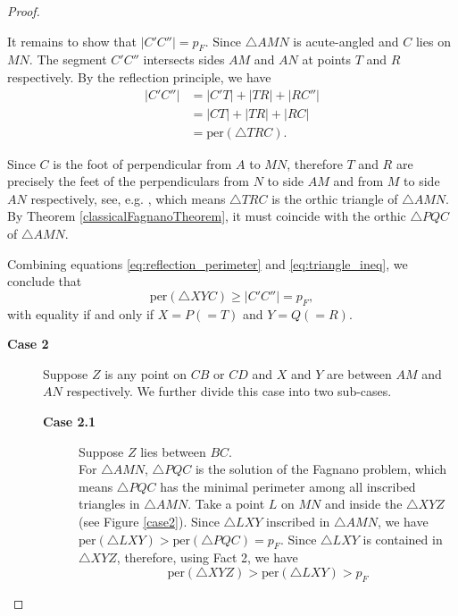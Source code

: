 \documentclass[12pt,a4paper]{article}
\theoremstyle{definition}
\theoremstyle{remark}
\begin{document}
\begin{proof}
\begin{description}
	It remains to show that $|C'C''| = p_F$. Since $\triangle AMN$ is acute-angled and $C$ lies on $MN$. The segment $C'C''$ intersects 	sides $AM$ and $AN$ at points $T$ and $R$ respectively. By the reflection 
	principle, we have
	\begin{align*}
		|C'C''| &= |C'T| + |TR| + |RC''|\\
		&= |CT| + |TR| + |RC|\\
		&= \mathrm{per}(\triangle TRC).
	\end{align*}
	
	
	Since $C$ is the foot of perpendicular from $A$ to $MN$, therefore $T$ and $R$ are precisely the feet of the perpendiculars from $N$ to side $AM$ and from $M$ to side $AN$ respectively, see,  e.g. \cite[Problem 1.1.3]{andreescu_geometric_2006}, which means $\triangle TRC$ is the orthic triangle of $\triangle AMN$. By Theorem  \ref{classicalFagnanoTheorem}, it must coincide with the orthic $\triangle PQC$ of  $\triangle AMN$.
	
	Combining equations \eqref{eq:reflection_perimeter} and 
	\eqref{eq:triangle_ineq}, we conclude that
	$$\mathrm{per}(\triangle XYC) \geq |C'C''| = p_F,$$
	with equality if and only if $X = P (=T)$ and $Y = Q(=R)$.
	
\end{description}



	
	
	
	
	
	
	
	
	
	
	
	
	
	

	
	\begin{description}
		\item[\textbf{Case 2}] Suppose $Z$ is any point on $CB$ or $CD$ and $X$ and $Y$ are between $AM$ and $AN$ respectively.
		We further divide this case into two sub-cases.  
		\begin{description}
			\item[\textbf{Case 2.1}] Suppose $Z$ lies between $BC$.\\
			For $\triangle AMN$, $\triangle PQC$ is the solution of the Fagnano problem, which means $\triangle PQC$ has the minimal perimeter among all inscribed triangles in $\triangle AMN.$ Take a point $L$ on $MN$ and inside the $\triangle XYZ$ (see Figure \ref{case2}). Since $\triangle LXY$  inscribed in $\triangle AMN$, we have $\text{per} (\triangle LXY) > \text{per} (\triangle PQC)=p_F.$ Since $\triangle LXY$ is contained in $\triangle XYZ$, therefore, using Fact 2, we have
			\begin{equation}
				\text{per} (\triangle XYZ) > \text{per} (\triangle LXY) > p_F
			\end{equation}
		\end{description}
		

\end{description}
\end{proof}
\end{document}
